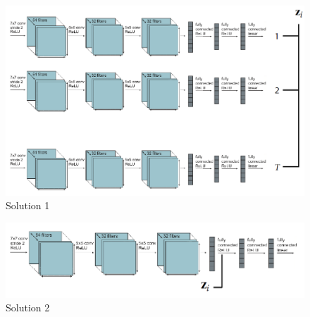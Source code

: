 \begin{minipage}{.5\linewidth}
    \begin{figure}[H]
        \centering
        \includegraphics[width=.95\linewidth]{images/mm-multitask-sol1}
        \caption[Solution 1]{Solution 1}
        \label{fig:mm-multitask-sol1}
    \end{figure}
\end{minipage}
\begin{minipage}{.5\linewidth}
    \begin{figure}[H]
        \centering
        \includegraphics[width=.95\linewidth]{images/mm-multitask-sol2}
        \caption[Solution 2]{Solution 2}
        \label{fig:mm-multitask-sol2}
    \end{figure}
\end{minipage}

